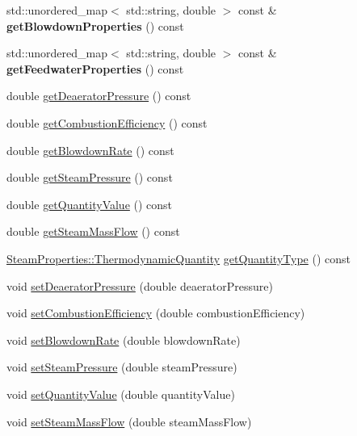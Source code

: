\begin{DoxyCompactItemize}
\mbox{\label{class_boiler_ac561af37c8c6d2f93cd4e38e8de9b8eb}} 
std\+::unordered\+\_\+map$<$ std\+::string, double $>$ const  \& {\bfseries get\+Blowdown\+Properties} () const
\item 
\mbox{\label{class_boiler_a7cf302e46f9128f7042928d51d094e50}} 
std\+::unordered\+\_\+map$<$ std\+::string, double $>$ const  \& {\bfseries get\+Feedwater\+Properties} () const
\item 
double \hyperlink{class_boiler_aad4786e7b68084e65a35dd6235517b8c}{get\+Deaerator\+Pressure} () const
\item 
double \hyperlink{class_boiler_a21c7423b756761c3216704b3f554feff}{get\+Combustion\+Efficiency} () const
\item 
double \hyperlink{class_boiler_aec9bf6eeed82d8d5f35284c65a3986e7}{get\+Blowdown\+Rate} () const
\item 
double \hyperlink{class_boiler_a99d4bbace6ef20bcbdc4b0cfcdc43213}{get\+Steam\+Pressure} () const
\item 
double \hyperlink{class_boiler_a78370a174135e6cc95abcd3b7ac2f947}{get\+Quantity\+Value} () const
\item 
double \hyperlink{class_boiler_a4101e71234995558a451dcab145b5fc9}{get\+Steam\+Mass\+Flow} () const
\item 
\hyperlink{class_steam_properties_ae0294bedf7d178c2d8fb6aed0f62fbff}{Steam\+Properties\+::\+Thermodynamic\+Quantity} \hyperlink{class_boiler_a26a71f789c9f9e05bd43a1ca0219f920}{get\+Quantity\+Type} () const
\item 
void \hyperlink{class_boiler_a56f422254606ebba1248ae0b4f8f0215}{set\+Deaerator\+Pressure} (double deaerator\+Pressure)
\item 
void \hyperlink{class_boiler_abef6bc48101f98f0650cb07fb1d51f74}{set\+Combustion\+Efficiency} (double combustion\+Efficiency)
\item 
void \hyperlink{class_boiler_a66c0e4c577dbd3f52dcf202e69a08371}{set\+Blowdown\+Rate} (double blowdown\+Rate)
\item 
void \hyperlink{class_boiler_a0a4619ff73c9969daebe3aa66ddad6be}{set\+Steam\+Pressure} (double steam\+Pressure)
\item 
void \hyperlink{class_boiler_ac3450d88dba124529d59baf62c39e14a}{set\+Quantity\+Value} (double quantity\+Value)
\item 
void \hyperlink{class_boiler_ada7af5896a2a4701d78a532dc9bc9892}{set\+Steam\+Mass\+Flow} (double steam\+Mass\+Flow)

\end{DoxyCompactItemize}
